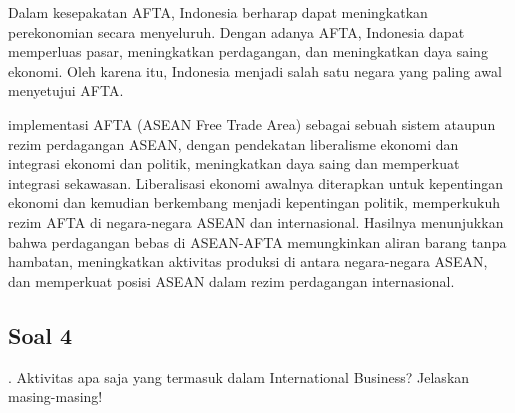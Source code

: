 \documentclass[12pt]{article}
\begin{document}
Dalam kesepakatan AFTA, Indonesia berharap dapat meningkatkan perekonomian secara menyeluruh. Dengan adanya AFTA, Indonesia dapat memperluas pasar, meningkatkan perdagangan, dan meningkatkan daya saing ekonomi. Oleh karena itu, Indonesia menjadi salah satu negara yang paling awal menyetujui AFTA.

implementasi AFTA (ASEAN Free Trade Area) sebagai sebuah sistem ataupun rezim perdagangan ASEAN, dengan pendekatan liberalisme ekonomi dan integrasi ekonomi dan politik, meningkatkan daya saing dan memperkuat integrasi sekawasan. Liberalisasi ekonomi awalnya diterapkan untuk kepentingan ekonomi dan kemudian berkembang menjadi kepentingan politik, memperkukuh rezim AFTA di negara-negara ASEAN dan internasional. Hasilnya menunjukkan bahwa perdagangan bebas di ASEAN-AFTA memungkinkan aliran barang tanpa hambatan, meningkatkan aktivitas produksi di antara negara-negara ASEAN, dan memperkuat posisi ASEAN dalam rezim perdagangan internasional\autocite{gani2021AFTAMR}.

\subsection*{Soal 4}
. Aktivitas apa saja yang termasuk dalam International Business? Jelaskan masing-masing!\\
\end{document}
